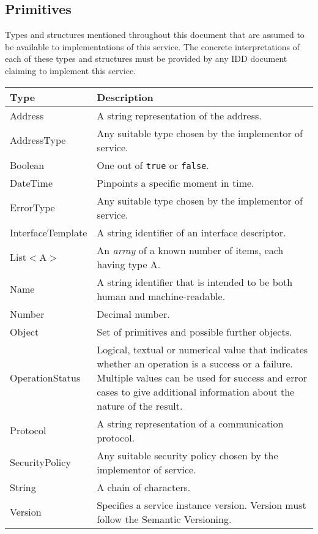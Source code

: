 \documentclass[a4paper]{arrowhead}
\newcommand{\pdef}[1]{{\textcolor{ArrowheadGrey}{#1\label{sec:model:primitives:#1}\label{sec:model:primitives:#1s}\label{sec:model:primitives:#1es}}}}
\begin{document}
\subsection{Primitives}
\label{sec:model:primitives}

Types and structures mentioned throughout this document that are assumed to be available to implementations of this service.
The concrete interpretations of each of these types and structures must be provided by any IDD document claiming to implement this service.


\begin{table}[ht!]
\begin{tabularx}{\textwidth}{| p{3cm} | X |} \hline
\rowcolor{gray!33} Type & Description \\ \hline
\pdef{Address}          & A string representation of the address. \\ \hline
\pdef{AddressType}      & Any suitable type chosen by the implementor of service. \\ \hline
\pdef{Boolean}          & One out of \texttt{true} or \texttt{false}. \\ \hline
\pdef{DateTime}         & Pinpoints a specific moment in time. \\ \hline
\pdef{ErrorType}        & Any suitable type chosen by the implementor of service. \\ \hline
\pdef{InterfaceTemplate} & A string identifier of an interface descriptor. \\ \hline
\pdef{List}$<$A$>$      & An \textit{array} of a known number of items, each having type A. \\ \hline
\pdef{Name}             & A string identifier that is intended to be both human and machine-readable. \\ \hline
\pdef{Number}           & Decimal number. \\ \hline
\pdef{Object}           & Set of primitives and possible further objects. \\ \hline
\pdef{OperationStatus}  & Logical, textual or numerical value that indicates whether an operation is a success or a failure. Multiple values can be used for success and error cases to give additional information about the nature of the result. \\ \hline
\pdef{Protocol}         & A string representation of a communication protocol. \\ \hline
\pdef{SecurityPolicy}   & Any suitable security policy chosen by the implementor of service. \\ \hline
\pdef{String}           & A chain of characters. \\ \hline
\pdef{Version}          & Specifies a service instance version. Version must follow the Semantic Versioning. \\ \hline
\end{tabularx}
\end{table}
\end{document}
